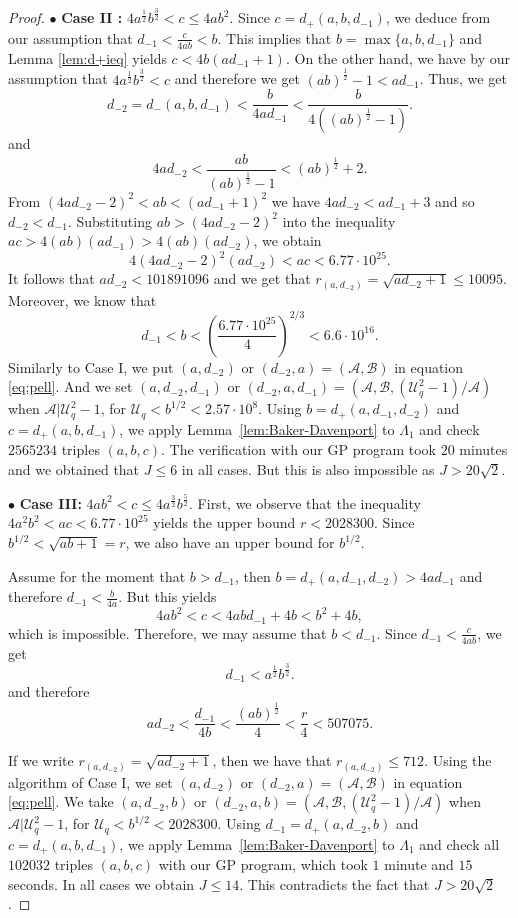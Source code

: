 \documentclass{amsart}
\theoremstyle{definition}
\begin{document}
\begin{proof}
\noindent $\bullet$ \textbf{Case II :}  $4a^{\frac{1}{2}}b^{\frac{3}{2}}<c\le4ab^2$. Since $c=d_{+}(a,b,d_{-1})$, we deduce from our assumption that
$d_{-1}<\frac{c}{4ab}<b$. This implies that $b=\max\{a,b,d_{-1}\}$ and Lemma \ref{lem:d+ieq} yields $c<4b(ad_{-1}+1)$.
On the other hand, we have by our assumption that $4a^{\frac{1}{2}}b^{\frac{3}{2}}<c$ and therefore we get $(ab)^{\frac{1}{2}}-1<ad_{-1}$.  
Thus, we get
$$
d_{-2}=d_{-}(a,b,d_{-1}) <\frac{b}{4ad_{-1}}<\frac{b}{4\left((ab)^{\frac{1}{2}}-1\right)}.
$$
and 
$$
4ad_{-2} < \frac{ab}{(ab)^{\frac{1}{2}}-1}< (ab)^{\frac{1}{2}}+2.
$$
From $(4ad_{-2}-2)^2<ab<(ad_{-1}+1)^2$ we have $4ad_{-2}<ad_{-1}+3$ and so $d_{-2}<d_{-1}$. 
Substituting $ab>(4ad_{-2}-2)^2$ into the inequality $ac>4(ab)(ad_{-1})>4(ab)(ad_{-2})$,  we obtain
$$
4(4ad_{-2}-2)^2(ad_{-2})<ac<6.77\cdot 10^{25}. 
$$
It follows that $ad_{-2}<101891096$ and we get that $r_{(a,d_{-2})}=\sqrt{ad_{-2}+1}\le 10095$. Moreover, we 
know that 
$$d_{-1}<b<\left(\frac{6.77\cdot10^{25}}4\right)^{2/3}<6.6\cdot 10^{16}.$$
Similarly to Case I,  we  put $(a,d_{-2})$ or $(d_{-2},a) = (\mathcal{A}, \mathcal{B})$ in equation \eqref{eq:pell}.
And we set $(a,d_{-2},d_{-1})$ or $(d_{-2},a,d_{-1})=(\mathcal{A},\mathcal{B},(\mathcal{U}_q^2-1)/\mathcal{A})$ 
when $\mathcal{A}|\mathcal{U}_q^2-1$, for $\mathcal{U}_q<b^{1/2}<2.57\cdot 10^8$. Using $b=d_{+}(a,d_{-1},d_{-2})$ and
$c=d_{+}(a,b,d_{-1})$, we apply Lemma~\ref{lem:Baker-Davenport} to $\Lambda_1$ and check
$2565234$ triples $(a,b,c)$. The verification with our GP program took $20$ minutes and we obtained that $J\le6$ in all cases. But this is also impossible as $J>20\sqrt{2}$.

\vspace{5mm}

\noindent $\bullet$ \textbf{Case III:} $4ab^{2}<c\le4a^{\frac{3}{2}}b^{\frac{5}{2}}$. First, we observe that the inequality $4a^2b^2 <ac<6.77\cdot 10^{25}$ yields the upper bound $r<2028300$. Since $b^{1/2}<\sqrt{ab+1}=r$, we also have an upper bound for $b^{1/2}$.

Assume for the moment that $b>d_{-1}$, then $b=d_{+}(a,d_{-1},d_{-2}) > 4ad_{-1}$ and therefore $d_{-1}<\frac{b}{4a}$.
But this yields
$$4ab^2<c<4abd_{-1}+4b<b^2+4b,$$
which is impossible. Therefore, we may assume that $b<d_{-1}$. Since $d_{-1}<\frac{c}{4ab}$, we get 
$$
d_{-1} < a^{\frac12}b^{\frac32}. 
$$
and therefore
$$
ad_{-2} <\frac{d_{-1}}{4b}<\frac{(ab)^{\frac12}}4<\frac r4<507075.
$$

If we write $r_{(a,d_{-2})} = \sqrt{ad_{-2}+1}$, then we have that $r_{(a,d_{-2})}\le 712$.
Using the algorithm of Case I, we set $(a,d_{-2})$ or $(d_{-2},a) = (\mathcal{A}, \mathcal{B})$ in equation \eqref{eq:pell}.
We take $(a,d_{-2},b)$ or $(d_{-2},a,b)=(\mathcal{A},\mathcal{B},(\mathcal{U}_q^2-1)/\mathcal{A})$ when $\mathcal{A}|\mathcal{U}_q^2-1$, 
for $\mathcal{U}_q<b^{1/2}<2028300$. Using $d_{-1}=d_{+}(a,d_{-2},b)$ and $c=d_{+}(a,b,d_{-1})$, we apply  Lemma~\ref{lem:Baker-Davenport}
to $\Lambda_1$ and check all $102032$ triples $(a,b,c)$ with our GP program, which took $1$ minute and $15$ seconds. In all cases we obtain $J\le 14$. This contradicts the fact that  $J>20\sqrt{2}$.


\end{proof}
\end{document}
